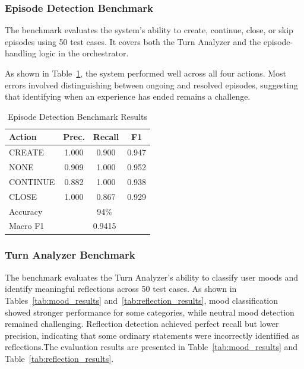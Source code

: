 \documentclass[conference]{IEEEtran}
\begin{document}
\subsubsection{Episode Detection Benchmark}
The benchmark evaluates the system's ability to create, continue, close, or skip episodes using 50 test cases. It covers both the Turn Analyzer and the episode-handling logic in the orchestrator.

As shown in Table~\ref{tab:episode_detection}, the system performed well across all four actions. Most errors involved distinguishing between ongoing and resolved episodes, suggesting that identifying when an experience has ended remains a challenge.

\begin{table}[!ht]
\centering
\footnotesize
\renewcommand{\arraystretch}{1.4}
\setlength{\tabcolsep}{8pt}
\begin{tabular}{|l|c|c|c|}
\hline
\textbf{Action} & \textbf{Prec.} & \textbf{Recall} & \textbf{F1} \\ \hline
CREATE   & 1.000 & 0.900 & 0.947 \\ \hline
NONE     & 0.909 & 1.000 & 0.952 \\ \hline
CONTINUE & 0.882 & 1.000 & 0.938 \\ \hline
CLOSE    & 1.000 & 0.867 & 0.929 \\ \hline
Accuracy & \multicolumn{3}{c|}{94\%} \\ \hline
Macro F1 & \multicolumn{3}{c|}{0.9415} \\ \hline
\end{tabular}
\renewcommand{\arraystretch}{1}
\setlength{\tabcolsep}{6pt}
\caption{Episode Detection Benchmark Results}
\label{tab:episode_detection}
\end{table}

\subsubsection{Turn Analyzer Benchmark}
The benchmark evaluates the Turn Analyzer's ability to classify user moods and identify meaningful reflections across 50 test cases. As shown in Tables~\ref{tab:mood_results} and~\ref{tab:reflection_results}, mood classification showed stronger performance for some categories, while neutral mood detection remained challenging. Reflection detection achieved perfect recall but lower precision, indicating that some ordinary statements were incorrectly identified as reflections.The evaluation results are presented in Table~\ref{tab:mood_results} and Table~\ref{tab:reflection_results}.
\end{document}
